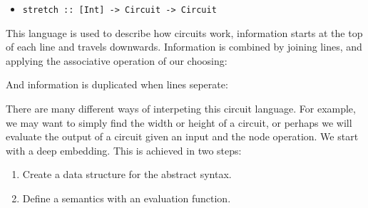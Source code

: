 \documentclass[a4paper,12pt]{article}
\theoremstyle{remark}
\begin{document}
\begin{itemize}
    \item \lstinline{stretch :: [Int] -> Circuit -> Circuit}

    \begin{figure}[H]
      \centering
    \end{figure}

  \end{itemize}

  This language is used to describe how circuits work, information starts at the
  top of each line and travels downwards. Information is combined by joining lines,
  and applying the associative operation of our choosing:

  \begin{figure}[H]
    \centering
  \end{figure}

  And information is duplicated when lines seperate:

  \begin{figure}[H]
    \centering
  \end{figure}

  There are many different ways of interpeting this circuit language. For example,
  we may want to simply find the width or height of a circuit, or perhaps we will
  evaluate the output of a circuit given an input and the node operation. We start
  with a deep embedding. This is achieved in two steps:
  \begin{enumerate}
    \item Create a data structure for the abstract syntax.
    \item Define a semantics with an evaluation function.
  \end{enumerate}
\end{document}
